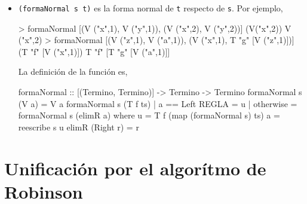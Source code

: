 \begin{itemize}
\item {} \texttt{(formaNormal s t)} es la
  forma normal de \texttt{t} respecto de \texttt{s}. Por ejemplo,
\begin{sesion}
> formaNormal [(V ("x",1), V ("y",1)),
  (V ("x",2), V ("y",2))] (V("x",2))
V ("x",2)
> formaNormal [(V ("z",1), V ("a",1)),
  (V ("x",1), T "g" [V ("z",1)])] (T "f" [V ("x",1)])
T "f" [T "g" [V ("a",1)]]
\end{sesion}
        
La definición de la función es,
       
\begin{codigo}
formaNormal :: [(Termino, Termino)] -> Termino -> Termino
formaNormal s (V a) = V a
formaNormal s (T f ts)
    | a == Left REGLA = u
    | otherwise = formaNormal s (elimR a)
     where u = T f (map (formaNormal s) ts)
           a = reescribe s u
           elimR (Right r) = r
\end{codigo}   
\end{itemize}


\section{Unificación por el algorítmo de Robinson}






